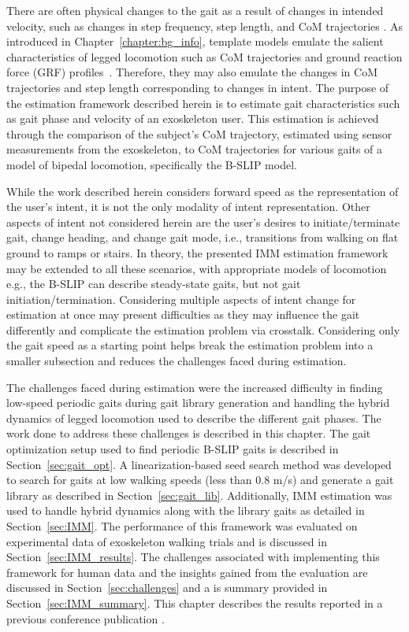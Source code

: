 There are often physical changes to the gait as a result of changes in intended velocity, such as changes in step frequency, step length, and CoM trajectories \cite{kuo2001simple}. As introduced in Chapter~\ref{chapter:bg_info}, template models emulate the salient characteristics of legged locomotion such as CoM trajectories and ground reaction force (GRF) profiles~\cite{mochon1980ballistic}. Therefore, they may also emulate the changes in CoM trajectories and step length corresponding to changes in intent. The purpose of the estimation framework described herein is to estimate gait characteristics such as gait phase and velocity of an exoskeleton user. This estimation is achieved through the comparison of the subject's CoM trajectory, estimated using sensor measurements from the exoskeleton, to CoM trajectories for various gaits of a model of bipedal locomotion, specifically the B-SLIP model.

While the work described herein considers forward speed as the representation of the user's intent, it is not the only modality of intent representation. Other aspects of intent not considered herein are the user's desires to initiate/terminate gait, change heading, and change gait mode, i.e., transitions from walking on flat ground to ramps or stairs. In theory, the presented IMM estimation framework may be extended to all these scenarios, with appropriate models of locomotion e.g., the B-SLIP can describe steady-state gaits, but not gait initiation/termination. Considering multiple aspects of intent change for estimation at once may present difficulties as they may influence the gait differently and complicate the estimation problem via crosstalk. Considering only the gait speed as a starting point helps break the estimation problem into a smaller subsection and reduces the challenges faced during estimation.

The challenges faced during estimation were the increased difficulty in finding low-speed periodic gaits during gait library generation and handling the hybrid dynamics of legged locomotion used to describe the different gait phases. The work done to address these challenges is described in this chapter. The gait optimization setup used to find periodic B-SLIP gaits is described in Section~\ref{sec:gait_opt}. A linearization-based seed search method was developed to search for gaits at low walking speeds (less than 0.8 m/s) and generate a gait library as described in Section~\ref{sec:gait_lib}. Additionally, IMM estimation was used to handle hybrid dynamics along with the library gaits as detailed in Section~\ref{sec:IMM}. The performance of this framework was evaluated on experimental data of exoskeleton walking trials and is discussed in Section~\ref{sec:IMM_results}. The challenges associated with implementing this framework for human data and the insights gained from the evaluation are discussed in Section~\ref{sec:challenges} and a is summary provided in Section~\ref{sec:IMM_summary}. This chapter describes the results reported in a previous conference publication \cite{karulkarapplication}.

